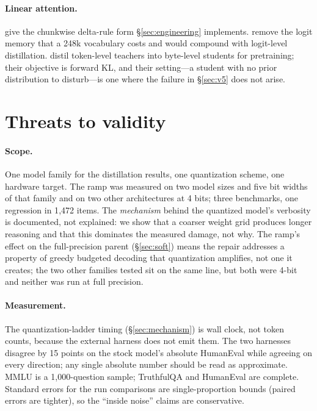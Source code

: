 \documentclass[11pt]{article}
\begin{document}
\paragraph{Linear attention.}
\citet{yang2024deltanet,yang2024gated} give the chunkwise delta-rule form
\S\ref{sec:engineering} implements.  \citet{wijmans2024cce} remove the logit
memory that a 248k vocabulary costs and would compound with logit-level
distillation.  \citet{marathe2026bytes} distil token-level teachers into
byte-level students for pretraining; their objective is forward KL, and their
setting---a student with no prior distribution to disturb---is one where the
failure in \S\ref{sec:v5} does not arise.

\section{Threats to validity}

\paragraph{Scope.}
One model family for the distillation results, one quantization scheme, one
hardware target.  The ramp was measured on two model sizes and five bit widths
of that family and on two other architectures at 4 bits; three benchmarks, one
regression in 1{,}472 items.  The
\emph{mechanism} behind the quantized model's verbosity is documented, not
explained: we show that a coarser weight grid produces longer reasoning and that
this dominates the measured damage, not why.  The ramp's effect on the
full-precision parent (\S\ref{sec:soft}) means the repair addresses a property
of greedy budgeted decoding that quantization amplifies, not one it creates;
the two other families tested sit on the same line, but both were 4-bit
and neither was run at full precision.

\paragraph{Measurement.}
The quantization-ladder timing (\S\ref{sec:mechanism}) is wall clock, not
token counts, because the external harness does not emit them.  The two
harnesses disagree by 15 points on the stock model's absolute HumanEval while
agreeing on every direction; any single absolute number should be read as
approximate.  MMLU is a 1{,}000-question sample; TruthfulQA and HumanEval are
complete.  Standard errors for the run comparisons are single-proportion
bounds (paired errors are tighter), so the ``inside noise'' claims are
conservative.
\end{document}
